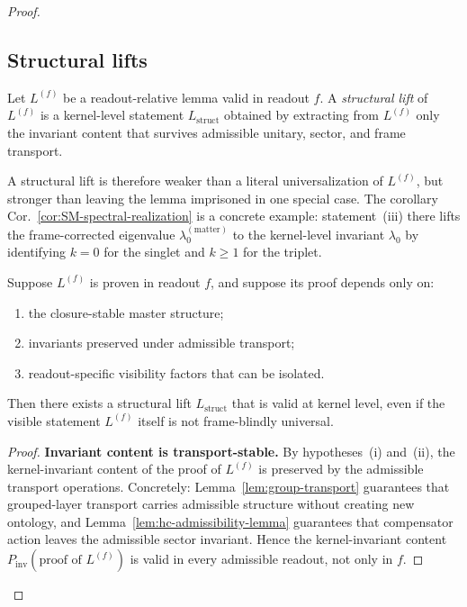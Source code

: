 \begin{proof}
\subsection*{Structural lifts}

\begin{definition}
\label{def:structural-lift}
Let $L^{(f)}$ be a readout-relative lemma valid in readout $f$.
A \emph{structural lift} of $L^{(f)}$ is a kernel-level statement
$L_{\mathrm{struct}}$ obtained by extracting from $L^{(f)}$ only the
invariant content that survives admissible unitary, sector, and frame
transport.
\end{definition}

\begin{remark}
A structural lift is therefore weaker than a literal universalization of
$L^{(f)}$, but stronger than leaving the lemma imprisoned in one special
case. The corollary Cor.~\ref{cor:SM-spectral-realization} is a concrete
example: statement~(iii) there lifts the frame-corrected eigenvalue
$\lambda_0^{(\mathrm{matter})}$ to the kernel-level invariant $\lambda_0$
by identifying $k=0$ for the singlet and $k\ge 1$ for the triplet.
\end{remark}

\begin{proposition}
\label{prop:structural-lift-principle}
Suppose $L^{(f)}$ is proven in readout $f$, and suppose its proof
depends only on:
\begin{enumerate}[label=(\roman*)]
  \item the closure-stable master structure;
  \item invariants preserved under admissible transport;
  \item readout-specific visibility factors that can be isolated.
\end{enumerate}
Then there exists a structural lift $L_{\mathrm{struct}}$ that is valid
at kernel level, even if the visible statement $L^{(f)}$ itself is not
frame-blindly universal.
\end{proposition}

\begin{proof}
\noindent\textbf{Invariant content is transport-stable.}
By hypotheses~(i) and~(ii), the kernel-invariant content of the proof
of $L^{(f)}$ is preserved by the admissible transport operations.
Concretely: Lemma~\ref{lem:group-transport} guarantees that grouped-layer
transport carries admissible structure without creating new ontology, and
Lemma~\ref{lem:hc-admissibility-lemma} guarantees that compensator action
leaves the admissible sector invariant. Hence the kernel-invariant content
$P_{\mathrm{inv}}(\text{proof of }L^{(f)})$ is valid in every admissible
readout, not only in $f$.


\end{proof}
\end{proof}
